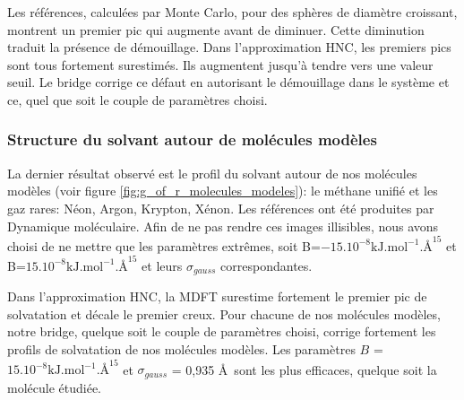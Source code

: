 Les références, calculées par Monte Carlo, pour des sphères de diamètre croissant, montrent un premier pic qui augmente avant de diminuer. Cette diminution traduit la présence de démouillage. Dans l'approximation HNC, les premiers pics sont tous fortement surestimés. Ils augmentent jusqu'à tendre vers une valeur seuil. Le bridge corrige ce défaut en autorisant le démouillage dans le système et ce, quel que soit le couple de paramètres choisi. 




\subsubsection{Structure du solvant autour de molécules modèles}
La dernier résultat observé est le profil du solvant autour de nos molécules modèles (voir figure \ref{fig:g_of_r_molecules_modeles}): le méthane unifié et les gaz rares: Néon, Argon, Krypton, Xénon. Les références ont été produites par Dynamique moléculaire. Afin de ne pas rendre ces images illisibles, nous avons choisi de ne mettre que les paramètres extrêmes, soit B=$-15.10^{-8} \mathrm{kJ.mol}^{-1}.\text{\AA}^{15}$ et B=$15.10^{-8} \mathrm{kJ.mol}^{-1}.\text{\AA}^{15}$ et leurs $\sigma_{gauss}$ correspondantes.


Dans l'approximation HNC, la MDFT surestime fortement le premier pic de solvatation et décale le premier creux. Pour chacune de nos molécules modèles, notre bridge, quelque soit le couple de paramètres choisi, corrige fortement les profils de solvatation de nos molécules modèles. Les paramètres $B$ = $15.10^{-8} \mathrm{kJ.mol}^{-1}.\text{\AA}^{15}$ et $\sigma_{gauss}$ = 0,935 \AA\ sont les plus efficaces, quelque soit la molécule étudiée.




